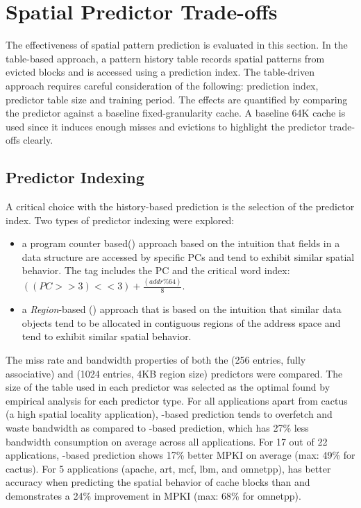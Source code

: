 {{\section{Spatial Predictor Trade-offs}
\label{sec:spatial_predictor_tradeoffs}

The effectiveness of spatial pattern prediction is evaluated in this section. In the table-based approach, a pattern history table records spatial patterns from evicted blocks and is accessed using a prediction index. The table-driven approach requires careful consideration of the following: prediction index, predictor table size and training period. The effects are quantified by comparing the predictor against a baseline fixed-granularity cache. A baseline 64K cache is used since it induces enough misses and evictions to highlight the predictor trade-offs clearly.

\subsection{Predictor Indexing} 

A critical choice with the history-based prediction is the selection of the predictor index. Two types of predictor indexing were explored:
\begin{itemize}[noitemsep]
  \item a program counter based() approach\cite{chen-hpca-2004} based on the intuition that fields in a data structure are accessed by specific PCs and tend to exhibit similar spatial behavior. The tag includes the PC and the critical word index: $((PC>>3)<<3)+\frac{(addr\%64)}{8}$.
  \item a \textit{Region}-based () approach that is based on the intuition that similar data objects tend to be allocated in contiguous  regions of the address space and tend to exhibit similar spatial behavior. 
\end{itemize}

The miss rate and bandwidth properties of both the  (256 entries, fully associative) and  (1024 entries, 4KB region size) predictors were compared. The size of the table used in each predictor was selected as the optimal found by empirical analysis for each predictor type.  For all applications apart from cactus (a high spatial locality application), -based prediction tends to overfetch and waste bandwidth as compared to -based prediction, which has 27\% less bandwidth consumption on average across all applications. For 17 out of 22 applications, -based prediction shows 17\%  better MPKI on average (max: 49\% for cactus). For 5 applications (apache, art, mcf, lbm, and omnetpp),  has better accuracy when predicting the spatial behavior of cache blocks than  and demonstrates a 24\% improvement in MPKI (max: 68\% for omnetpp).

}}
